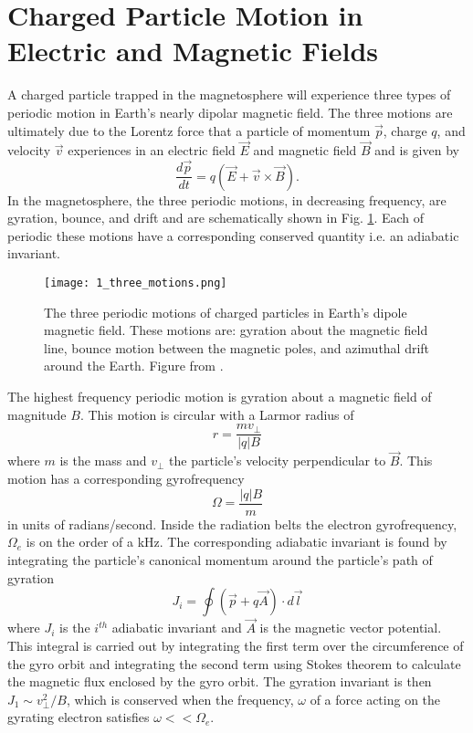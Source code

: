 \section{Charged Particle Motion in Electric and Magnetic Fields}\label{Intro:particle_motion}
A charged particle trapped in the magnetosphere will experience three types of periodic motion in Earth's nearly dipolar magnetic field. The three motions are ultimately due to the Lorentz force that a particle of momentum $\vec{p}$, charge $q$, and velocity $\vec{v}$ experiences in an electric field $\vec{E}$ and magnetic field $\vec{B}$ and is given by
\begin{equation} \label{Intro:Lorentz}
\frac{d\vec{p}}{dt} = q(\vec{E} + \vec{v} \times \vec{B}).
\end{equation} In the magnetosphere, the three periodic motions, in decreasing frequency, are gyration, bounce, and drift and are schematically shown in Fig. \ref{Intro:motion_diagram}. Each of periodic these motions have a corresponding conserved quantity i.e. an adiabatic invariant. 

\begin{figure}
\texttt{[image: 1\_three\_motions.png]}
\caption{The three periodic motions of charged particles in Earth's dipole magnetic field. These motions are: gyration about the magnetic field line, bounce motion between the magnetic poles, and azimuthal drift around the Earth. Figure from \citep{Baumjohann1997}.}
\label{Intro:motion_diagram}
\end{figure}


The highest frequency periodic motion is gyration about a magnetic field of magnitude $B$. This motion is circular with a Larmor radius of 
\begin{equation}
r = \frac{m v_\perp}{|q| B}
\end{equation} where $m$ is the mass and $v_\perp$ the particle's velocity perpendicular to $\vec{B}$. This motion has a corresponding gyrofrequency 
\begin{equation}
\Omega = \frac{|q| B}{m}
\end{equation} in units of radians/second. Inside the radiation belts the electron gyrofrequency, $\Omega_e$ is on the order of a kHz. The corresponding adiabatic invariant is found by integrating the particle's canonical momentum around the particle's path of gyration
\begin{equation} \label{J}
J_i = \oint (\vec{p} + q \vec{A}) \cdot d\vec{l}
\end{equation} where $J_i$ is the $i^{th}$ adiabatic invariant and $\vec{A}$ is the magnetic vector potential. This integral is carried out by integrating the first term over the circumference of the gyro orbit and integrating the second term using Stokes theorem to calculate the magnetic flux enclosed by the gyro orbit.  The gyration invariant is then $J_1 \sim v_\perp^2 / B$, which is conserved when the frequency, $\omega$ of a force acting on the gyrating electron satisfies $\omega << \Omega_e$.

